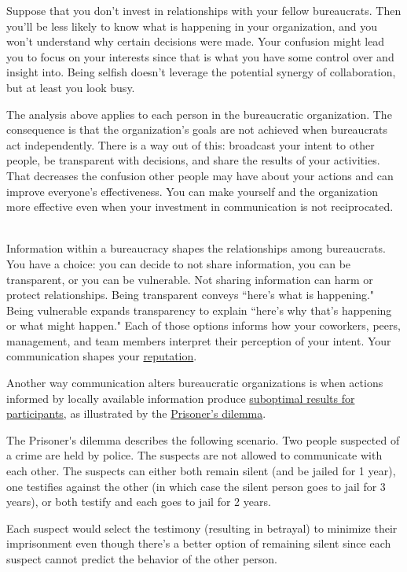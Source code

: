 Suppose that you don't invest in relationships with your fellow bureaucrats. Then you'll be less likely to know what is happening in your organization, and you won't understand why certain decisions were made. Your confusion might lead you to focus on your interests since that is what you have some control over and insight into. Being selfish doesn't leverage the potential synergy of collaboration, but at least you look busy. 

The analysis above applies to each person in the bureaucratic organization.
The consequence is that the organization's goals are not achieved when bureaucrats act independently. 
There is a way out of this: broadcast your intent to other people, be transparent with decisions, and share the results of your activities. That decreases the confusion other people may have about your actions and can improve everyone's effectiveness. You can make yourself and the organization more effective even when your investment in communication is not reciprocated.

\ \\

Information within a bureaucracy shapes the relationships among bureaucrats. You have a choice: you can decide to not share information, you can be transparent, or you can be vulnerable.  
Not sharing information can harm or protect relationships. 
Being transparent conveys ``here's what is happening." Being vulnerable expands transparency to explain ``here's why that's happening or what might happen."
Each of those options informs how your coworkers, peers, management, and team members interpret their perception of your intent. Your communication shapes your \hyperref[sec:reputation]{reputation}.


Another way communication alters bureaucratic organizations is when actions informed by locally available information produce \hyperref[sec:failure-to-comm]{suboptimal results for participants}, 
%
as illustrated by the
\href{https://en.wikipedia.org/wiki/Prisoner\%27s\_dilemma}{Prisoner's dilemma}. 

\begin{mdframed}[frametitle={Prisoner's Dilemma},frametitlerule=true,frametitlealignment=\centering]
The \gls{Prisoner's dilemma} describes the following scenario. Two people suspected of a crime are held by police. The suspects are not allowed to communicate with each other. The suspects can either both remain silent (and be jailed for 1 year), one testifies against the other (in which case the silent person goes to jail for 3 years), or both testify and each goes to jail for 2 years.

Each suspect would select the testimony (resulting in betrayal) to minimize their imprisonment even though there's a better option of remaining silent since each suspect cannot predict the behavior of the other person. 
\label{prisoners_dilemma_explanation}
\end{mdframed}

